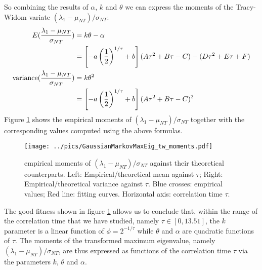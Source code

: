 \documentclass{book}
\begin{document}
So combining the results of $\alpha$, $k$ and $\theta$ we can express
the moments of the Tracy-Widom variate ${(\lambda_1 -
  \mu_{NT})/\sigma_{NT}}$:
\begin{equation}\label{eq:lambda1_MeanVariance}
  \begin{aligned}
    E({\lambda_1 - \mu_{NT} \over \sigma_{NT}}) &= k\theta -
    \alpha \\
    &= \left[-a\left(1 \over 2\right)^{1/\tau} + b\right](A\tau^2 +
    B\tau - C) - (D\tau^2 + E\tau + F) \\
    \text{variance}({\lambda_1 - \mu_{NT} \over \sigma_{NT}}) &=
    k\theta^2 \\
    &= \left[-a\left(1 \over 2\right)^{1/\tau} + b\right](A\tau^2 +
    B\tau - C)^2 \\
  \end{aligned}
\end{equation}
Figure \ref{fig:GaussianMarkovMaxEig_tw_moments} shows the empirical
moments of ${(\lambda_1 - \mu_{NT})/\sigma_{NT}}$ together with the
corresponding values computed using the above formulas.
\begin{figure}[htb!]
  \vspace{-15mm}
  \centering
  \texttt{[image: ../pics/GaussianMarkovMaxEig\_tw\_moments.pdf]}
  \caption{\footnotesize empirical moments of ${(\lambda_1 -
      \mu_{NT})/\sigma_{NT}}$ against their theoretical
    counterparts. Left: Empirical/theoretical mean against $\tau$;
    Right: Empirical/theoretical variance against $\tau$. Blue
    crosses: empirical values; Red line: fitting curves. Horizontal
    axis: correlation time $\tau$.}
\label{fig:GaussianMarkovMaxEig_tw_moments}
\end{figure}
The good fitness shown in figure
\ref{fig:GaussianMarkovMaxEig_tw_moments} allows us to conclude 
that, within the range of the correlation time that we have studied,
namely $\tau \in [0, 13.51]$, the $k$ parameter is a linear function
of $\phi = 2^{-1/\tau}$ while $\theta$ and $\alpha$ are quadratic
functions of $\tau$. The moments of the transformed maximum
eigenvalue, namely ${(\lambda_1 - \mu_{NT})/\sigma_{NT}}$, are thus
expressed as functions of the correlation time $\tau$ via the
parameters $k$, $\theta$ and $\alpha$.
\end{document}

